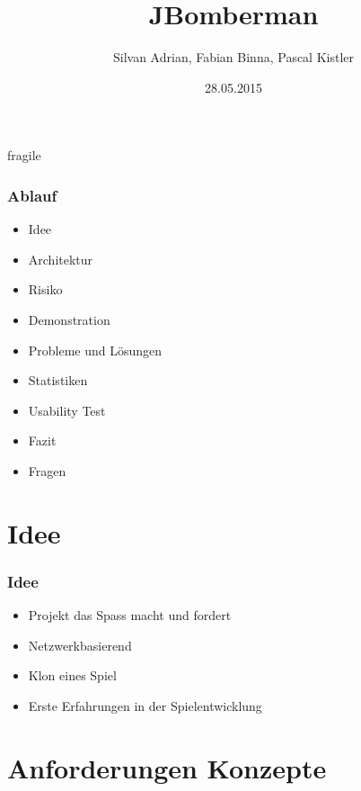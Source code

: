 \documentclass[10pt, compress]{beamer}
\title{JBomberman}
\subtitle{}
\date{28.05.2015}
\author{Silvan Adrian, Fabian Binna, Pascal Kistler}
\institute{Hochschule für Technik Rapperswil \newline \newline
Webseite: \textcolor{red}{\href{http://se2p.zonk.io}{http://se2p.zonk.io}}}
\begin{document}
\maketitle

\begin{frame}{fragile}
	\frametitle{Ablauf}
	\begin{itemize}
	\item Idee
	\item Architektur
	\item Risiko
	\item Demonstration
	\item Probleme und Lösungen
	\item Statistiken
	\item Usability Test
	\item Fazit
	\item Fragen
	\end{itemize}
\end{frame}


\section{Idee}
\begin{frame}[fragile]
  \frametitle{Idee}
	\begin{itemize}
	  \item Projekt das Spass macht und fordert
	  \item Netzwerkbasierend
	  \item Klon eines Spiel
	  \item Erste Erfahrungen in der Spielentwicklung
	\end{itemize}
\end{frame}



\section{Anforderungen  Konzepte}
\end{document}
